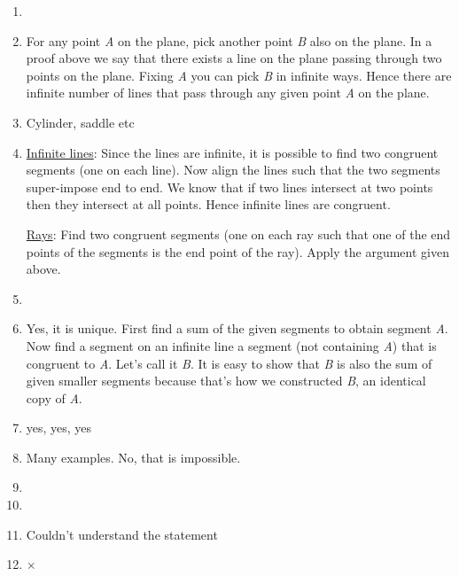 \begin{enumerate}
	\item 
	
	\item For any point \textit{A} on the plane, pick another point \textit{B} also on the plane. In a proof above we say that there exists a line on the plane passing through two points on the plane. Fixing \textit{A} you can pick \textit{B} in infinite ways. Hence there are infinite number of lines that pass through any given point \textit{A} on the plane.
	
	\item Cylinder, saddle etc
	
	\item \underline{Infinite lines}: Since the lines are infinite, it is possible to find two congruent segments (one on each line). Now align the lines such that the two segments super-impose end to end. We know that if two lines intersect at two points then they intersect at all points. Hence infinite lines are congruent.
	
	\underline{Rays}: Find two congruent segments (one on each ray such that one of the end points of the segments is the end point of the ray). Apply the argument given above.
	
	\item 
	
	\item Yes, it is unique. First find a sum of the given segments to obtain segment \textit{A}. Now find a segment on an infinite line a segment (not containing \textit{A}) that is congruent to \textit{A}. Let's call it \textit{B}. It is easy to show that \textit{B} is also the sum of given smaller segments because that's how we constructed \textit{B}, an identical copy of \textit{A}.
	
	\item yes, yes, yes
	
	\item Many examples. No, that is impossible.
	
	\item 
	
	\item 
	
	\item Couldn't understand the statement
	
	\item $\times$
	
\end{enumerate}
